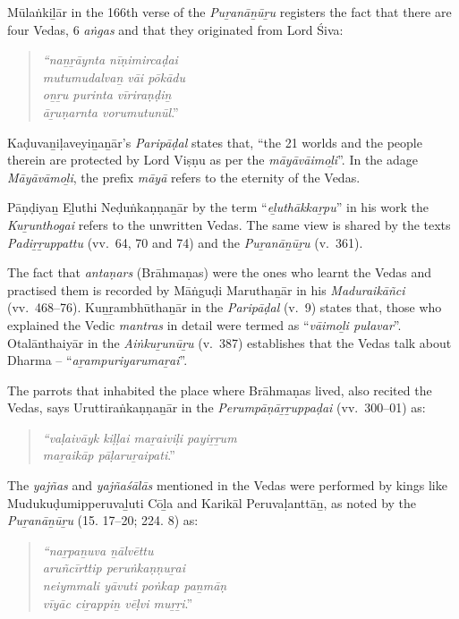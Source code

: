 Mūlaṅkiḻār in the 166th verse of the \textit{Puṟanāṉūṟu} registers the fact that there are four Vedas, 6 \textit{aṅgas} and that they originated from Lord Śiva:

\begin{quote}
\textit{“naṉṟāynta nīṇimircaḍai}\\\textit{mutumudalvaṉ vāi pōkādu}\\\textit{oṉṟu purinta vīriraṇḍiṉ}\\\textit{āṟuṇarnta vorumutunūl}.”
\end{quote}

Kaḍuvaṉiḷaveyiṉaṉār’s \textit{Paripāḍal} states that, “the 21 worlds and the people therein are protected by Lord Viṣṇu as per the \textit{māyāvāimoḻi}”. In the adage \textit{Māyāvāmoḻi}, the prefix \textit{māyā} refers to the eternity of the Vedas.

Pāṇḍiyaṉ Eḻuthi Neḍuṅkaṇṇaṉār by the term “\textit{eḻuthākkaṟpu}” in his work the \textit{Kuṟunthogai} refers to the unwritten Vedas. The same view is shared by the texts \textit{Padiṟṟuppattu} (vv.~64, 70 and 74) and the \textit{Puṟanāṉūṟu} (v.~361).

The fact that \textit{antaṇars} (Brāhmaṇas) were the ones who learnt the Vedas and practised them is recorded by Māṅguḍi Maruthaṉār in his \textit{Maduraikāñci} (vv.~468–76). Kuṉṟambhūthaṉār in the \textit{Paripāḍal} (v.~9) states that, those who explained the Vedic \textit{mantras} in detail were termed as “\textit{vāimoḻi pulavar}”. Otalānthaiyār in the \textit{Aiṅkuṟunūṟu} (v.~387) establishes that the Vedas talk about Dharma – “\textit{aṟampuriyarumaṟai}”.

The parrots that inhabited the place where Brāhmaṇas lived, also recited the Vedas, says Uruttiraṅkaṇṇaṉār in the \textit{Perumpāṇāṟṟuppaḍai} (vv.~300–01) as:

\begin{quote}
\textit{“vaḷaivāyk kiḷḷai maṟaiviḷi payiṟṟum}\\\textit{ maṟaikāp pāḷaruṟaipati}.”
\end{quote}

The \textit{yajñas} and \textit{yajñaśālās} mentioned in the Vedas were performed by kings like Mudukuḍumipperuvaḻuti Cōḻa and Karikāl Peruvaḷanttāṉ, as noted by the \textit{Puṟanāṉūṟu} (15. 17–20; 224. 8) as:

\begin{quote}
\textit{“naṟpaṉuva ṉālvēttu}\\\textit{aruñcīrttip peruṅkaṇṇuṟai}\\\textit{neiymmali yāvuti poṅkap paṉmāṇ}\\\textit{vīyāc ciṟappiṉ vēḷvi muṟṟi}.”
\end{quote}

